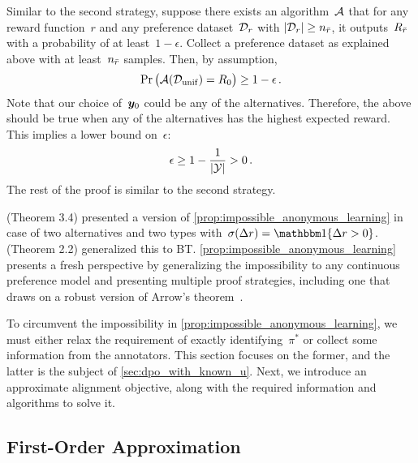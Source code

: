 \begin{proofEnd}
    Similar to the second strategy, suppose there exists an algorithm~${\mathcal{A}}$ that for any reward function~$r$ and any preference dataset~${\mathcal{D}}_r$ with $|{\mathcal{D}}_r| \ge n_{\bar{r}}$, it outputs~$R_{\bar{r}}$ with a probability of at least~$1-\epsilon$. Collect a preference dataset as explained above with at least~$n_{\bar{r}}$ samples. Then, by assumption,
    \begin{equation*}
        \Pr\big({\mathcal{A}}({\mathcal{D}}_{\rm unif}) = R_0\big) \ge 1 - \epsilon
        \,.
    \end{equation*}
    Note that our choice of~${\bm{y}}_0$ could be any of the alternatives. Therefore, the above should be true when any of the alternatives has the highest expected reward. This implies a lower bound on~$\epsilon$:
    \begin{equation*}
        \epsilon \ge 1 - \frac{1}{|{\mathcal{Y}}|} > 0
        \,.
    \end{equation*}
    The rest of the proof is similar to the second strategy. 
\end{proofEnd}
\citet{siththaranjan2023distributional} (Theorem 3.4) presented a version of \cref{prop:impossible_anonymous_learning} in case of two alternatives and two types with~$\sigma(\Delta r) = \One\{\Delta r > 0\}$. \citet{procaccia2025clone} (Theorem 2.2) generalized this to BT. \cref{prop:impossible_anonymous_learning} presents a fresh perspective by generalizing the impossibility to any continuous preference model and presenting multiple proof strategies, including one that draws on a robust version of Arrow's theorem~\citep{friedgut2002boolean}.

To circumvent the impossibility in \cref{prop:impossible_anonymous_learning}, we must either relax the requirement of exactly identifying~$\pi^*$ or collect some information from the annotators. This section focuses on the former, and the latter is the subject of \cref{sec:dpo_with_known_u}. Next, we introduce an approximate alignment objective, along with the required information and algorithms to solve it.
 

\subsection{First-Order Approximation}

